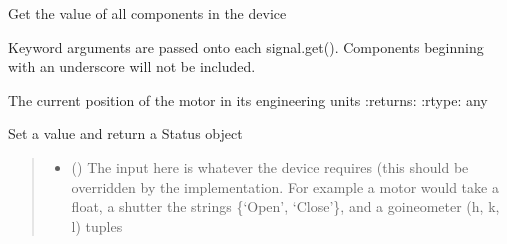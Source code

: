 \documentclass[letterpaper,10pt,english]{sphinxmanual}
\begin{document}
\begin{fulllineitems}
\label{\detokenize{API:raypyng_bluesky.axes.RaypyngAxis}}
\pysigstartsignatures
{}
\pysigstopsignatures{}

\begin{fulllineitems}
\label{\detokenize{API:raypyng_bluesky.axes.RaypyngAxis.get}}
\pysigstartsignatures
{}
\pysigstopsignatures
\sphinxAtStartPar
Get the value of all components in the device

\sphinxAtStartPar
Keyword arguments are passed onto each signal.get(). Components
beginning with an underscore will not be included.

\end{fulllineitems}


\begin{fulllineitems}
\label{\detokenize{API:raypyng_bluesky.axes.RaypyngAxis.position}}
\pysigstartsignatures
{}
\pysigstopsignatures
\sphinxAtStartPar
The current position of the motor in its engineering units
:returns: 
:rtype: any

\end{fulllineitems}


\begin{fulllineitems}
\label{\detokenize{API:raypyng_bluesky.axes.RaypyngAxis.set}}
\pysigstartsignatures
{}
\pysigstopsignatures
\sphinxAtStartPar
Set a value and return a Status object
\begin{quote}\begin{description}
\begin{itemize}
\item {} 
\sphinxAtStartPar
{} () \textendash{} The input here is whatever the device requires (this
should be over\sphinxhyphen{}ridden by the implementation.  For example
a motor would take a float, a shutter the strings \{‘Open’,
‘Close’\}, and a goineometer (h, k, l) tuples


\end{itemize}
\end{description}
\end{quote}
\end{fulllineitems}
\end{fulllineitems}
\end{document}
